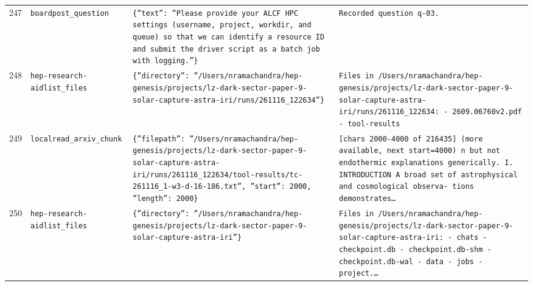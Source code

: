 \documentclass[11pt,a4paper]{article}
\begin{document}
\begin{longtable}{@{}p{}p{}p{}p{}@{}}
247 & \texttt{board}\newline\texttt{post\_\allowbreak{}question} & \texttt{\{''text'':\allowbreak{} ''Please provide your ALCF HPC settings (username,\allowbreak{} project,\allowbreak{} workdir,\allowbreak{} and queue)\allowbreak{} so that we can identify a resource ID and submit the driver script as a batch job with logging.''\}\allowbreak{}} & \texttt{Recorded question q-03.} \\
248 & \texttt{hep-research-aid}\newline\texttt{list\_\allowbreak{}files} & \texttt{\{''directory'':\allowbreak{} ''/\allowbreak{}Users/\allowbreak{}nramachandra/\allowbreak{}hep-genesis/\allowbreak{}projects/\allowbreak{}lz-dark-sector-paper-9-solar-capture-astra-iri/\allowbreak{}runs/\allowbreak{}261116\_\allowbreak{}122634''\}\allowbreak{}} & \texttt{Files in /\allowbreak{}Users/\allowbreak{}nramachandra/\allowbreak{}hep-genesis/\allowbreak{}projects/\allowbreak{}lz-dark-sector-paper-9-solar-capture-astra-iri/\allowbreak{}runs/\allowbreak{}261116\_\allowbreak{}122634:\allowbreak{}   - 2609.06760v2.pdf   - tool-results} \\
249 & \texttt{local}\newline\texttt{read\_\allowbreak{}arxiv\_\allowbreak{}chunk} & \texttt{\{''filepath'':\allowbreak{} ''/\allowbreak{}Users/\allowbreak{}nramachandra/\allowbreak{}hep-genesis/\allowbreak{}projects/\allowbreak{}lz-dark-sector-paper-9-solar-capture-astra-iri/\allowbreak{}runs/\allowbreak{}261116\_\allowbreak{}122634/\allowbreak{}tool-results/\allowbreak{}tc-261116\_\allowbreak{}1-w3-d-16-186.txt'',\allowbreak{} ''start'':\allowbreak{} 2000,\allowbreak{} ''length'':\allowbreak{} 2000\}\allowbreak{}} & \texttt{[chars 2000-4000 of 216435]\allowbreak{} (more available,\allowbreak{} next start=\allowbreak{}4000)\allowbreak{}  n but not endothermic explanations generically. I. INTRODUCTION A broad set of astrophysical and cosmological observa- tions demonstrates\ldots{}\allowbreak{}} \\
250 & \texttt{hep-research-aid}\newline\texttt{list\_\allowbreak{}files} & \texttt{\{''directory'':\allowbreak{} ''/\allowbreak{}Users/\allowbreak{}nramachandra/\allowbreak{}hep-genesis/\allowbreak{}projects/\allowbreak{}lz-dark-sector-paper-9-solar-capture-astra-iri''\}\allowbreak{}} & \texttt{Files in /\allowbreak{}Users/\allowbreak{}nramachandra/\allowbreak{}hep-genesis/\allowbreak{}projects/\allowbreak{}lz-dark-sector-paper-9-solar-capture-astra-iri:\allowbreak{}   - chats   - checkpoint.db   - checkpoint.db-shm   - checkpoint.db-wal   - data   - jobs   - project.\ldots{}\allowbreak{}} \\

\end{longtable}
\end{document}
